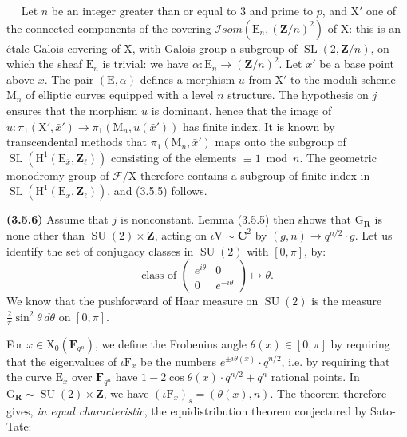 \documentclass[11pt,leqno]{article}
\newcommand{\Page}[1]{\ifvmode\noindent\else\unskip\ \fi{\footnotesize\textcolor{gray}{[p.\,#1]}}\ \ignorespaces}
\begin{document}
\Page{212}
Let \(n\) be an integer greater than or equal to \(3\) and prime to \(p\), and \(\mathrm X'\) one of the connected components of the covering \(\mathscr I\mathit{som}(\mathrm E_n,(\mathbf Z/n)^2)\) of \(\mathrm X\): this is an étale Galois covering of \(\mathrm X\), with Galois group a subgroup of \(\operatorname{SL}(2,\mathbf Z/n)\), on which the sheaf \(\mathrm E_n\) is trivial: we have \(\alpha:\mathrm E_n\to(\mathbf Z/n)^2\). Let \(\bar x'\) be a base point above \(\bar x\). The pair \((\mathrm E,\alpha)\) defines a morphism \(u\) from \(\mathrm X'\) to the moduli scheme \(\mathrm M_n\) of elliptic curves equipped with a level \(n\) structure. The hypothesis on \(j\) ensures that the morphism \(u\) is dominant, hence that the image of \(u:\pi_1(\mathrm X',\bar x')\to\pi_1(\mathrm M_n,u(\bar x'))\) has finite index. It is known by transcendental methods that \(\pi_1(\mathrm M_n,\bar x')\) maps onto the subgroup of \(\operatorname{SL}(\mathrm H^1(\mathrm E_{\bar x},\mathbf Z_\ell))\) consisting of the elements \(\equiv1\bmod n\). The geometric monodromy group of \(\mathscr F/\mathrm X\) therefore contains a subgroup of finite index in \(\operatorname{SL}(\mathrm H^1(\mathrm E_{\bar x},\mathbf Z_\ell))\), and (3.5.5) follows.

\textbf{(3.5.6)} Assume that \(j\) is nonconstant. Lemma (3.5.5) then shows that \(\mathrm G_{\mathbf R}\) is none other than \(\operatorname{SU}(2)\times\mathbf Z\), acting on \(\iota\mathrm V\sim\mathbf C^2\) by \((g,n)\to q^{n/2}\cdot g\). Let us identify the set of conjugacy classes in \(\operatorname{SU}(2)\) with \([0,\pi]\), by:
\[
\text{class of }
\begin{pmatrix}
e^{i\theta}&0\\
0&e^{-i\theta}
\end{pmatrix}
\longmapsto\theta.
\]
We know that the pushforward of Haar measure on \(\operatorname{SU}(2)\) is the measure \(\displaystyle\frac{2}{\pi}\sin^2\theta\,d\theta\) on \([0,\pi]\).

For \(x\in\mathrm X_0(\mathbf F_{q^n})\), we define the Frobenius angle \(\theta(x)\in[0,\pi]\) by requiring that the eigenvalues of \(\iota\mathrm F_x\) be the numbers \(e^{\pm i\theta(x)}\cdot q^{n/2}\), i.e. by requiring that the curve \(\mathrm E_x\) over \(\mathbf F_{q^n}\) have \(1-2\cos\theta(x)\cdot q^{n/2}+q^n\) rational points. In \(\mathrm G_{\mathbf R}\sim\operatorname{SU}(2)\times\mathbf Z\), we have \((\iota\mathrm F_x)_s=(\theta(x),n)\). The theorem therefore gives, \textit{in equal characteristic}, the equidistribution theorem conjectured by Sato-Tate:
\end{document}
